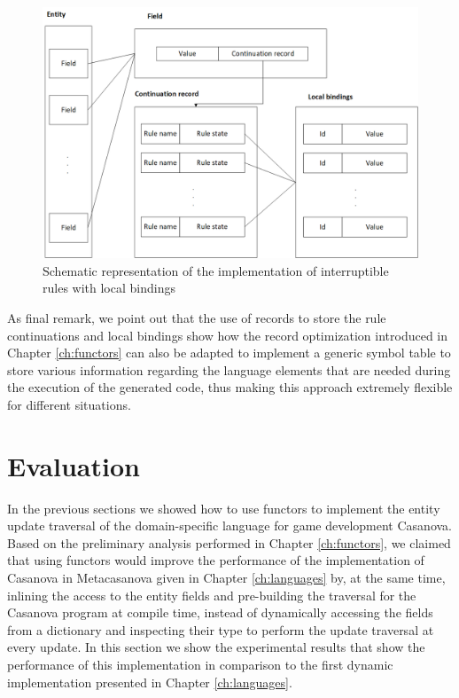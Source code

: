 \begin{figure}
  \centering
  \includegraphics[width=\textwidth]{Figures/chapter_networking/interruptible_rules_with_state}
  \caption{Schematic representation of the implementation of interruptible rules with local bindings}
  \label{fig:ch_networking_interruptible_rules_with_state}
\end{figure}

As final remark, we point out that the use of records to store the rule continuations and local bindings show how the record optimization introduced in Chapter \ref{ch:functors} can also be adapted to implement a generic symbol table to store various information regarding the language elements that are needed during the execution of the generated code, thus making this approach extremely flexible for different situations.

\section{Evaluation}
\label{subsec:ch_functor_languages_evaluation}
In the previous sections we showed how to use functors to implement the entity update traversal of the domain-specific language for game development Casanova. Based on the preliminary analysis performed in Chapter \ref{ch:functors}, we claimed that using functors would improve the performance of the implementation of Casanova in Metacasanova given in Chapter \ref{ch:languages} by, at the same time, inlining the access to the entity fields and pre-building the traversal for the Casanova program at compile time, instead of dynamically accessing the fields from a dictionary and inspecting their type to perform the update traversal at every update. In this section we show the experimental results that show the performance of this implementation in comparison to the first dynamic implementation presented in Chapter \ref{ch:languages}.

